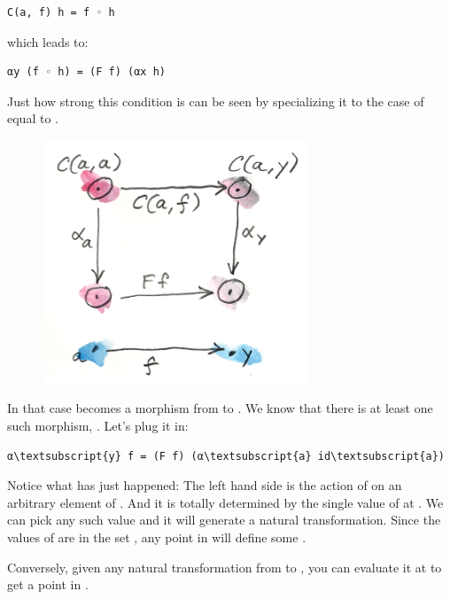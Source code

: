 \begin{Verbatim}[commandchars=\\\{\}]
C(a, f) h = f ◦ h
\end{Verbatim}
which leads to:

\begin{Verbatim}[commandchars=\\\{\}]
αy (f ◦ h) = (F f) (αx h)
\end{Verbatim}
Just how strong this condition is can be seen by specializing it to the
case of  equal to .

\begin{figure}[H]
\centering
\includegraphics[width=3.12500in]{images/yoneda2.png}
\end{figure}

\noindent
In that case  becomes a morphism from  to
. We know that there is at least one such morphism,
. Let's plug it in:

\begin{Verbatim}[commandchars=\\\{\}]
α\textsubscript{y} f = (F f) (α\textsubscript{a} id\textsubscript{a})
\end{Verbatim}
Notice what has just happened: The left hand side is the action of
 on an arbitrary element  of . And
it is totally determined by the single value of  at
. We can pick any such value and it will generate a natural
transformation. Since the values of  are in the set
, any point in  will define some .

Conversely, given any natural transformation  from
 to , you can evaluate it at  to
get a point in .

